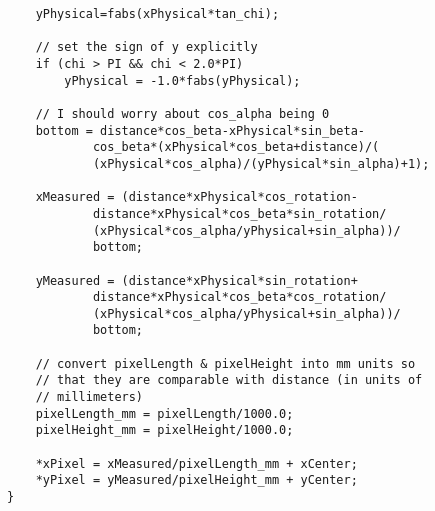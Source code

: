 \begin{lstlisting}
    yPhysical=fabs(xPhysical*tan_chi);

    // set the sign of y explicitly
    if (chi > PI && chi < 2.0*PI)
        yPhysical = -1.0*fabs(yPhysical);

    // I should worry about cos_alpha being 0
    bottom = distance*cos_beta-xPhysical*sin_beta-
            cos_beta*(xPhysical*cos_beta+distance)/(
            (xPhysical*cos_alpha)/(yPhysical*sin_alpha)+1);

    xMeasured = (distance*xPhysical*cos_rotation-
            distance*xPhysical*cos_beta*sin_rotation/
            (xPhysical*cos_alpha/yPhysical+sin_alpha))/
            bottom;

    yMeasured = (distance*xPhysical*sin_rotation+ 
            distance*xPhysical*cos_beta*cos_rotation/
            (xPhysical*cos_alpha/yPhysical+sin_alpha))/
            bottom;

    // convert pixelLength & pixelHeight into mm units so 
    // that they are comparable with distance (in units of 
    // millimeters)
    pixelLength_mm = pixelLength/1000.0;
    pixelHeight_mm = pixelHeight/1000.0;

    *xPixel = xMeasured/pixelLength_mm + xCenter;
    *yPixel = yMeasured/pixelHeight_mm + yCenter;
}
\end{lstlisting}
